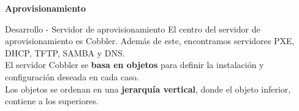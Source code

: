 
\begin{frame}
    \Huge
    \centering
    \textbf{Aprovisionamiento}

\end{frame}

\begin{frame}{Desarrollo - Servidor de aprovisionamiento}
    \vspace{0cm}
    El centro del servidor de aprovisionamiento es Cobbler. Además de este, encontramos servidores PXE, DHCP, TFTP, SAMBA y DNS.
    \vspace{0.5cm}
    \\ 
    El servidor Cobbler se \textbf{basa en objetos} para definir la instalación y configuración deseada en cada caso.
    \\
    Los objetos se ordenan en una  \textbf{jerarquía vertical}, donde el objeto inferior, contiene a los superiores.
    
\end{frame}

